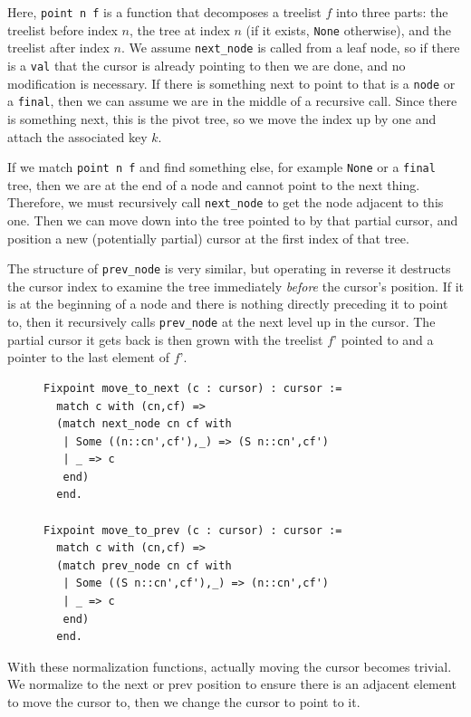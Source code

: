 \documentclass[a4paper,12pt]{article}
\begin{document}
Here, \texttt{point n f} is a function that decomposes a treelist $f$ into three parts: the treelist before index $n$, the tree at index $n$ (if it exists, \texttt{None} otherwise), and the treelist after index $n$. We assume \texttt{next\_node} is called from a leaf node, so if there is a \texttt{val} that the cursor is already pointing to then we are done, and no modification is necessary. If there is something next to point to that is a \texttt{node} or a \texttt{final}, then we can assume we are in the middle of a recursive call. Since there is something next, this is the pivot tree, so we move the index up by one and attach the associated key $k$.

If we match \texttt{point n f} and find something else, for example \texttt{None} or a \texttt{final} tree, then we are at the end of a node and cannot point to the next thing. Therefore, we must recursively call \texttt{next\_node} to get the node adjacent to this one. Then we can move down into the tree pointed to by that partial cursor, and position a new (potentially partial) cursor at the first index of that tree.

The structure of \texttt{prev\_node} is very similar, but operating in reverse it destructs the cursor index to examine the tree immediately \textit{before} the cursor’s position. If it is at the beginning of a node and there is nothing directly preceding it to point to, then it recursively calls \texttt{prev\_node} at the next level up in the cursor. The partial cursor it gets back is then grown with the treelist $f’$ pointed to and a pointer to the last element of $f’$.

\begin{figure}[h]
\begin{singlespace}
\begin{verbatim}
Fixpoint move_to_next (c : cursor) : cursor :=
  match c with (cn,cf) =>
  (match next_node cn cf with
   | Some ((n::cn',cf'),_) => (S n::cn',cf')
   | _ => c
   end)
  end.

Fixpoint move_to_prev (c : cursor) : cursor :=
  match c with (cn,cf) =>
  (match prev_node cn cf with
   | Some ((S n::cn',cf'),_) => (n::cn',cf')
   | _ => c
   end)
  end.
\end{verbatim}
\end{singlespace}
\end{figure}

With these normalization functions, actually moving the cursor becomes trivial. We normalize to the next or prev position to ensure there is an adjacent element to move the cursor to, then we change the cursor to point to it.
\end{document}
